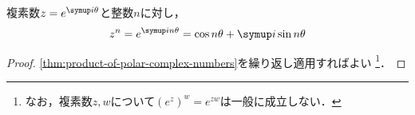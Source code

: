 \documentclass[../sotsu.tex]{subfiles}
\begin{document}
\begin{theorem}[ド・モアブルの定理]
    複素数$z = e^{\iu \theta}$と整数$n$に対し，
    \begin{equation*}
        z^n = e^{\iu n \theta}
            = \cos n\theta + \iu \sin n\theta
    \end{equation*}
\end{theorem}



\begin{proof}
    \cref{thm:product-of-polar-complex-numbers}を繰り返し適用すればよい%
    \footnote{
        なお，複素数$z, w$について$(e^z)^w = e^{zw}$は一般に成立しない．
    }．
\end{proof}
\end{document}
